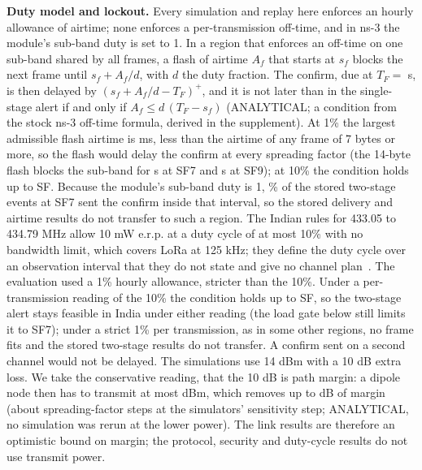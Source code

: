 \documentclass{ieeeaccess}
\begin{document}
\textbf{Duty model and lockout.} Every simulation and replay here enforces an hourly allowance of airtime; none enforces a per-transmission off-time, and in ns-3 the module's sub-band duty is set to 1. In a region that enforces an off-time on one sub-band shared by all frames, a flash of airtime $A_f$ that starts at $s_f$ blocks the next frame until $s_f + A_f/d$, with $d$ the duty fraction. The confirm, due at $T_F=$ \DutyDue{} s, is then delayed by $(s_f + A_f/d - T_F)^+$, and it is not later than in the single-stage alert if and only if $A_f \le d\,(T_F - s_f)$ (ANALYTICAL; a condition from the stock ns-3 off-time formula, derived in the supplement). At 1\% the largest admissible flash airtime is \DutyCritMs{} ms, less than the airtime of any frame of 7 bytes or more, so the flash would delay the confirm at every spreading factor (the 14-byte flash blocks the sub-band for \DutyLockSeven{} s at SF7 and \DutyLockNine{} s at SF9); at 10\% the condition holds up to SF\DutyMaxSfTen{}. Because the module's sub-band duty is 1, \DutyStoredShare\% of the stored two-stage events at SF7 sent the confirm inside that interval, so the stored delivery and airtime results do not transfer to such a region. The Indian rules for 433.05 to 434.79 MHz allow 10 mW e.r.p. at a duty cycle of at most 10\% with no bandwidth limit, which covers LoRa at 125 kHz; they define the duty cycle over an observation interval that they do not state and give no channel plan~\cite{gsr347}. The evaluation used a 1\% hourly allowance, stricter than the 10\%. Under a per-transmission reading of the 10\% the condition holds up to SF\IndiaMaxSf{}, so the two-stage alert stays feasible in India under either reading (the load gate below still limits it to SF7); under a strict 1\% per transmission, as in some other regions, no frame fits and the stored two-stage results do not transfer. A confirm sent on a second channel would not be delayed. The simulations use 14 dBm with a 10 dB extra loss. We take the conservative reading, that the 10 dB is path margin: a dipole node then has to transmit at most \RsevbPowerMaxDipole{} dBm, which removes up to \RsevbPowerExtraDb{} dB of margin (about \RsevbPowerSfSteps{} spreading-factor steps at the simulators' sensitivity step; ANALYTICAL, no simulation was rerun at the lower power). The link results are therefore an optimistic bound on margin; the protocol, security and duty-cycle results do not use transmit power.
\end{document}
